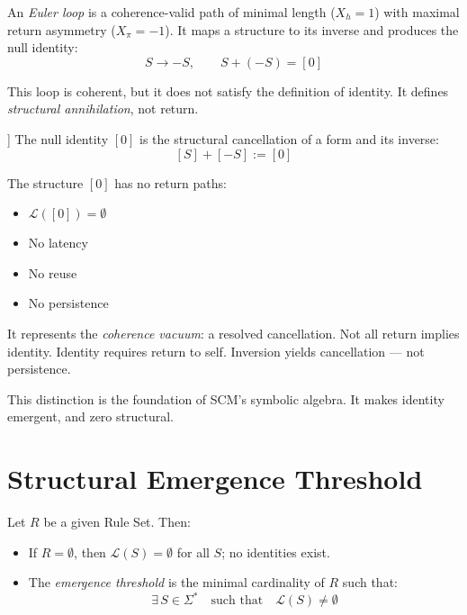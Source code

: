 \begin{definition} \label{def:euler-inversion-loop}
An \textit{Euler loop} is a coherence-valid path of minimal length ($X_h = 1$) with maximal return asymmetry ($X_\pi = -1$).  
It maps a structure to its inverse and produces the null identity:
\begin{equation} \label{eq:euler-cancellation}
S \rightarrow -S, \qquad S + (-S) = [0]
\end{equation}

This loop is coherent, but it does not satisfy the definition of identity.  
It defines \textit{structural annihilation}, not return.
\end{definition}

\begin{definition}[Null Identity [0]] \label{def:null-identity}
The null identity $[0]$ is the structural cancellation of a form and its inverse:
\begin{equation} \label{eq:null-identity-definition}
[S] + [-S] := [0]
\end{equation}
\end{definition}

The structure $[0]$ has no return paths:
\begin{itemize}
  \item $\mathcal{L}([0]) = \emptyset$
  \item No latency
  \item No reuse
  \item No persistence
\end{itemize}

It represents the \textit{coherence vacuum}: a resolved cancellation.  
Not all return implies identity. Identity requires return to self.  
Inversion yields cancellation — not persistence.

This distinction is the foundation of SCM's symbolic algebra. It makes identity emergent, and zero structural.

\section{Structural Emergence Threshold}

Let $R$ be a given Rule Set. Then:
\begin{itemize}
  \item If $R = \emptyset$, then $\mathcal{L}(S) = \emptyset$ for all $S$; no identities exist.
  \item The \textit{emergence threshold} is the minimal cardinality of $R$ such that:
  \begin{equation} \label{eq:emergence-threshold}
  \exists\, S \in \Sigma^* \quad \text{such that} \quad \mathcal{L}(S) \neq \emptyset
  \end{equation}
\end{itemize}

